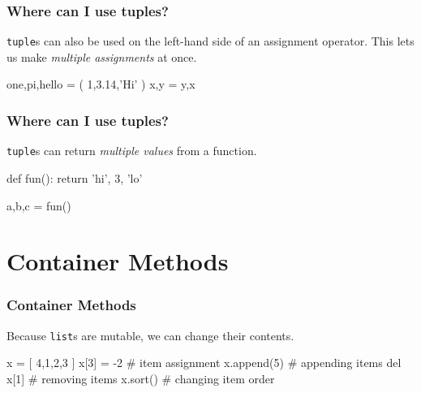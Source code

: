 \documentclass[11pt]{beamer}
\begin{document}
\begin{frame}[fragile]
  \frametitle{Where can I use tuples?}
  \Enlarge

  \begin{itemize}
  \myitem  \texttt{tuple}s can also be used on the left-hand side of an assignment operator. %
  \myitem  This lets us make \emph{multiple assignments} at once. %
  \end{itemize}
  \begin{semiverbatim}
one,pi,hello = ( 1,3.14,'Hi' ) %
x,y = y,x
  \end{semiverbatim}
\end{frame}

\begin{frame}[fragile]
  \frametitle{Where can I use tuples?}
  \Enlarge

  \begin{itemize}
  \myitem  \texttt{tuple}s can return \emph{multiple values} from a function. %
  \end{itemize}
  \begin{semiverbatim}
def fun():
    return 'hi', 3, 'lo'

a,b,c = fun()
  \end{semiverbatim}
\end{frame}

\section{Container Methods}

\begin{frame}[fragile]
  \frametitle{Container Methods}
  \Enlarge

  \begin{itemize}
  \myitem  Because \texttt{list}s are mutable, we can change their contents. %
  \end{itemize}
  \begin{semiverbatim}
x = [ 4,1,2,3 ]
x[3] = -2       # item assignment
x.append(5)     # appending items
del x[1]        # removing items
x.sort()        # changing item order
  \end{semiverbatim}
\end{frame}
\end{document}
